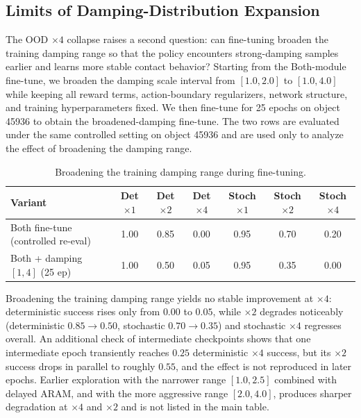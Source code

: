\subsection{Limits of Damping-Distribution Expansion}
\label{sec:damprangeexp}

The OOD $\times4$ collapse raises a second question: can fine-tuning
broaden the training damping range so that the policy encounters
strong-damping samples earlier and learns more stable contact
behavior? Starting from the Both-module fine-tune, we broaden the
damping scale interval from $[1.0, 2.0]$ to $[1.0, 4.0]$ while
keeping all reward terms, action-boundary regularizers, network
structure, and training hyperparameters fixed. We then fine-tune for
25 epochs on object 45936 to obtain
the broadened-damping fine-tune. The two rows are evaluated under the
same controlled setting on object 45936 and are used only to analyze
the effect of broadening the damping range.

\begin{table}[t]
\centering
\caption{Broadening the training damping range during fine-tuning.}
\label{tab:damprange}
\small
\begin{tabular}{lcccccc}
\toprule
Variant & Det $\times1$ & Det $\times2$ & Det $\times4$ & Stoch $\times1$ & Stoch $\times2$ & Stoch $\times4$ \\
\midrule
Both fine-tune (controlled re-eval) & 1.00 & 0.85 & 0.00 & 0.95 & 0.70 & 0.20 \\
Both + damping $[1,4]$ (25 ep)   & 1.00 & 0.50 & 0.05 & 0.95 & 0.35 & 0.00 \\
\bottomrule
\end{tabular}
\end{table}

Broadening the training damping range yields no stable improvement
at $\times4$: deterministic success rises only from $0.00$ to $0.05$,
while $\times2$ degrades noticeably (deterministic
$0.85 \to 0.50$, stochastic $0.70 \to 0.35$) and stochastic $\times4$
regresses overall. An additional check of intermediate checkpoints
shows that one intermediate epoch transiently reaches $0.25$
deterministic $\times4$ success, but its $\times2$ success drops in parallel
to roughly $0.55$, and the effect is not reproduced in later epochs.
Earlier exploration with the narrower range $[1.0, 2.5]$ combined
with delayed ARAM, and with the more aggressive range $[2.0, 4.0]$,
produces sharper degradation at $\times4$ and $\times2$ and is not listed in
the main table.

